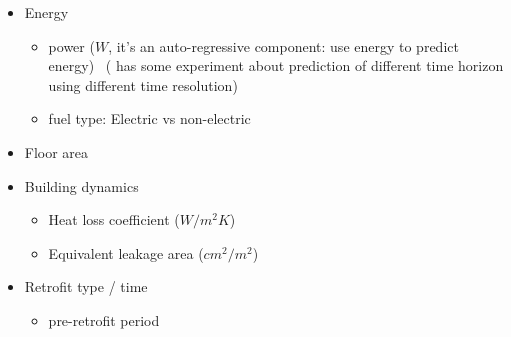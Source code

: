 \documentclass[12pt]{article}
\begin{document}
\begin{itemize}
\item Energy
  \begin{itemize}
  \item power ($W$, it's an auto-regressive component: use energy to
    predict energy)
    ~\cite{hammarsten1987critical}(\cite{mocanu2016deep} has some
    experiment about prediction of different time horizon using
    different time resolution)
  \item fuel type: Electric vs non-electric ~\cite{Yu20101637}
  \end{itemize}
\item Floor area~\cite{Yu20101637}
\item Building dynamics
  \begin{itemize}
  \item Heat loss coefficient ($W / m^2K$)~\cite{Yu20101637}
  \item Equivalent leakage area ($cm^2 / m^2$)~\cite{Yu20101637}
  \end{itemize}
\item Retrofit type / time
  \begin{itemize}
  \item pre-retrofit period~\cite{kissock2008methodology}
  \end{itemize}
\end{itemize}
\end{document}
